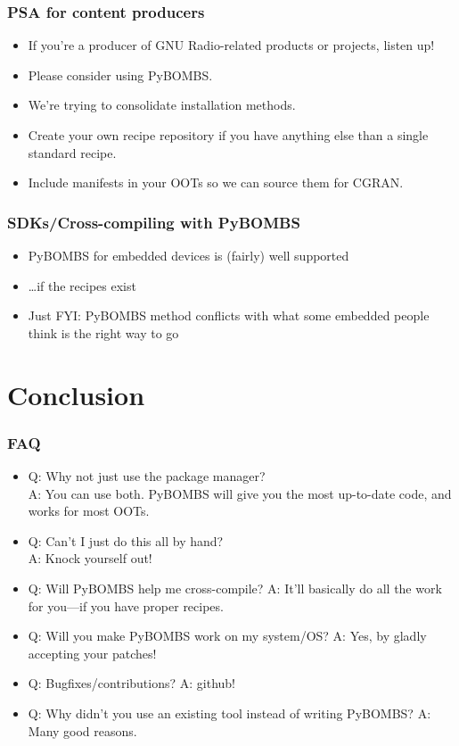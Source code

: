 \documentclass{beamer}
\begin{document}
\begin{frame}
  \frametitle{PSA for content producers}
  \begin{itemize}
    \item If you're a producer of GNU Radio-related products or projects, listen up!
    \item Please consider using PyBOMBS\@.
    \item We're trying to consolidate installation methods.
    \item Create your own recipe repository if you have anything else than a single standard recipe.
    \item Include manifests in your OOTs so we can source them for CGRAN\@.
  \end{itemize}
\end{frame}

\begin{frame}
  \frametitle{SDKs/Cross-compiling with PyBOMBS}
  \begin{itemize}
    \item PyBOMBS for embedded devices is (fairly) well supported
    \item \ldots{}if the recipes exist
    \item Just FYI\@: PyBOMBS method conflicts with what some embedded people think is the right way to go
  \end{itemize}
\end{frame}

\section{Conclusion}
\begin{frame}
  \frametitle{FAQ}
  \begin{itemize}
    \item Q\@: Why not just use the package manager?\\A\@: You can use both. PyBOMBS will give you the most up-to-date code, and works for most OOTs.
    \item Q\@: Can't I just do this all by hand?\\A\@: Knock yourself out!
    \item Q\@: Will PyBOMBS help me cross-compile? A\@: It'll basically do all the work for you---if you have proper recipes.
    \item Q\@: Will you make PyBOMBS work on my system/OS\@? A\@: Yes, by gladly accepting your patches!
    \item Q\@: Bugfixes/contributions? A\@: github!
    \item Q\@: Why didn't you use an existing tool instead of writing PyBOMBS\@? A\@: Many good reasons.
  \end{itemize}
\end{frame}
\end{document}

